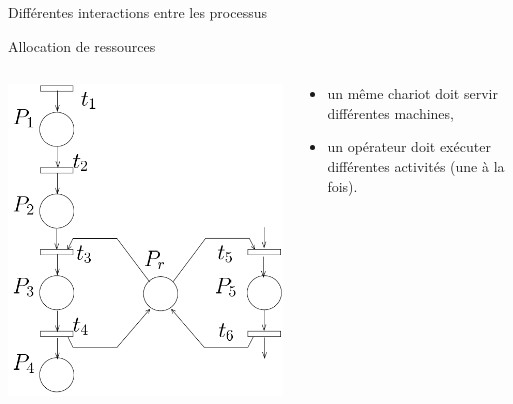 \documentclass[compress]{beamer}
\begin{document}
\begin{frame}{Différentes interactions entre les processus}
\begin{block}{Allocation de ressources}
\begin{columns}
	\begin{column}{.3\linewidth}
		\begin{center}
			\includegraphics[width=\linewidth]{frecurso}
		\end{center}
	\end{column}
	\begin{column}{.7\linewidth}
		\begin{itemize}
		\item un même chariot doit servir différentes machines,
		\item un opérateur doit exécuter  différentes activités (une à la fois).
		\end{itemize}  
	\end{column}
\end{columns}
\end{block}
\end{frame}
\end{document}
